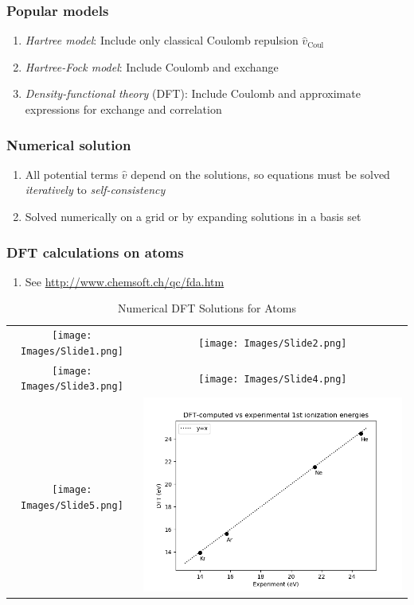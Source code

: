 \documentclass[11pt]{article}
\begin{document}
\subsubsection{Popular models}
\label{sec:orgc165cc8}
\begin{enumerate}
\item \emph{Hartree model}: Include only classical Coulomb repulsion \(\hat v_\mathrm{Coul}\)
\item \emph{Hartree-Fock model}: Include Coulomb and exchange
\item \emph{Density-functional theory} (DFT): Include Coulomb and
approximate expressions for exchange and correlation
\end{enumerate}
\subsubsection{Numerical solution}
\label{sec:orge5a242d}
\begin{enumerate}
\item All potential terms \(\hat v\) depend on the solutions, so  equations must be solved \emph{iteratively} to \emph{self-consistency}
\item Solved numerically on a grid or by expanding solutions in a basis set
\end{enumerate}
\subsubsection{DFT calculations on atoms}
\label{sec:orgb00e836}
\begin{enumerate}
\item See \url{http://www.chemsoft.ch/qc/fda.htm}
\end{enumerate}

\begin{table}[]
   \caption{Numerical DFT Solutions for Atoms }
\begin{tabular}{cc}
\texttt{[image: Images/Slide1.png]} & \texttt{[image: Images/Slide2.png]} \\
\texttt{[image: Images/Slide3.png]} & \texttt{[image: Images/Slide4.png]} \\
\texttt{[image: Images/Slide5.png]} & \includegraphics[scale=0.5]{Images/Ionization.png} 
\end{tabular}
\end{table}
\end{document}
